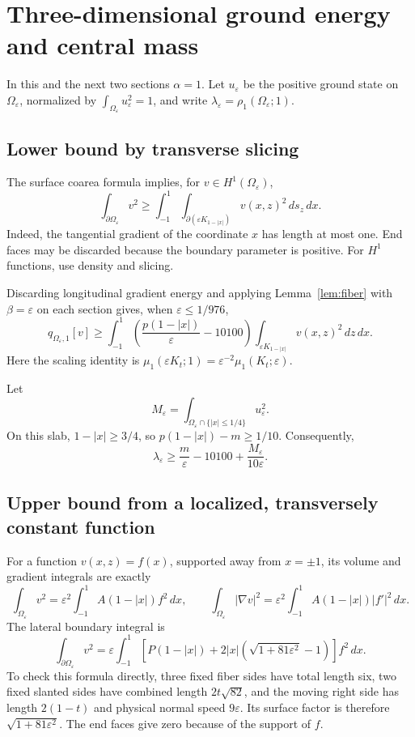 \documentclass[11pt,a4paper]{article}
\theoremstyle{remark}
\newcommand{\eps}{\varepsilon}
\begin{document}
\section{Three-dimensional ground energy and central mass}
In this and the next two sections $\alpha=1$. Let $u_\eps$ be the positive ground state on $\Omega_\eps$, normalized by $\int_{\Omega_\eps}u_\eps^2=1$, and write $\lambda_\eps=\rho_1(\Omega_\eps;1)$.

\subsection{Lower bound by transverse slicing}
The surface coarea formula implies, for $v\in H^1(\Omega_\eps)$,
\[
 \int_{\partial\Omega_\eps}v^2
 \ge\int_{-1}^1\int_{\partial(\eps K_{1-|x|})}v(x,z)^2\,ds_z\,dx.
\]
Indeed, the tangential gradient of the coordinate $x$ has length at most one. End faces may be discarded because the boundary parameter is positive. For $H^1$ functions, use density and slicing.

Discarding longitudinal gradient energy and applying Lemma~\ref{lem:fiber} with $\beta=\eps$ on each section gives, when $\eps\le1/976$,
\begin{equation}\label{eq:full-lower}
 q_{\Omega_\eps,1}[v]\ge
 \int_{-1}^1\left(\frac{p(1-|x|)}{\eps}-10100\right)
 \int_{\eps K_{1-|x|}}v(x,z)^2\,dz\,dx.
\end{equation}
Here the scaling identity is
$\mu_1(\eps K_t;1)=\eps^{-2}\mu_1(K_t;\eps)$.

Let
\[
 M_\eps=\int_{\Omega_\eps\cap\{|x|\le1/4\}}u_\eps^2.
\]
On this slab, $1-|x|\ge3/4$, so $p(1-|x|)-m\ge1/10$. Consequently,
\begin{equation}\label{eq:mass-lower}
 \lambda_\eps\ge\frac m\eps-10100+\frac{M_\eps}{10\eps}.
\end{equation}

\subsection{Upper bound from a localized, transversely constant function}
For a function $v(x,z)=f(x)$, supported away from $x=\pm1$, its volume and gradient integrals are exactly
\[
 \int_{\Omega_\eps}v^2=\eps^2\int_{-1}^1 A(1-|x|)f^2\,dx,\qquad
 \int_{\Omega_\eps}|\nabla v|^2=\eps^2\int_{-1}^1 A(1-|x|)|f'|^2\,dx.
\]
The lateral boundary integral is
\begin{equation}\label{eq:lateral}
 \int_{\partial\Omega_\eps}v^2
 =\eps\int_{-1}^1\left[P(1-|x|)
 +2|x|\left(\sqrt{1+81\eps^2}-1\right)\right]f^2\,dx.
\end{equation}
To check this formula directly, three fixed fiber sides have total length six, two fixed slanted sides have combined length $2t\sqrt{82}$, and the moving right side has length $2(1-t)$ and physical normal speed $9\eps$. Its surface factor is therefore $\sqrt{1+81\eps^2}$. The end faces give zero because of the support of $f$.
\end{document}
